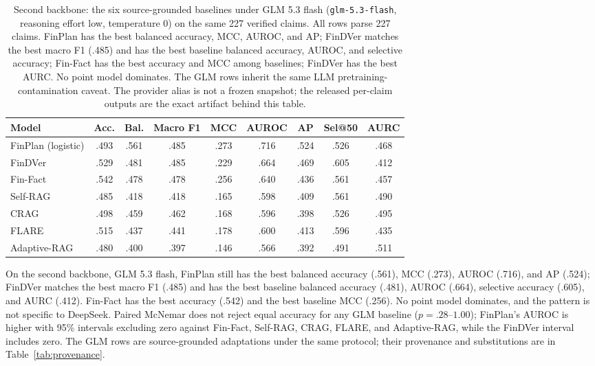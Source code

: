 \documentclass[11pt]{article}
\begin{document}
\begin{table}[t]
\centering
\small
\setlength{\tabcolsep}{3pt}
\begin{tabular}{lcccccccc}
\toprule
Model & Acc. & Bal. & Macro F1 & MCC & AUROC & AP & Sel@50 & AURC \\
\midrule
FinPlan (logistic) & .493 & .561 & .485 & .273 & .716 & .524 & .526 & .468 \\
FinDVer & .529 & .481 & .485 & .229 & .664 & .469 & .605 & .412 \\
Fin-Fact & .542 & .478 & .478 & .256 & .640 & .436 & .561 & .457 \\
Self-RAG & .485 & .418 & .418 & .165 & .598 & .409 & .561 & .490 \\
CRAG & .498 & .459 & .462 & .168 & .596 & .398 & .526 & .495 \\
FLARE & .515 & .437 & .441 & .178 & .600 & .413 & .596 & .435 \\
Adaptive-RAG & .480 & .400 & .397 & .146 & .566 & .392 & .491 & .511 \\
\bottomrule
\end{tabular}
\caption{Second backbone: the six source-grounded baselines under GLM 5.3
flash (\texttt{glm-5.3-flash}, reasoning effort low, temperature 0) on the same
227 verified claims. All rows parse 227 claims. FinPlan has the best balanced
accuracy, MCC, AUROC, and AP; FinDVer matches the best macro F1 (.485) and has
the best baseline balanced accuracy, AUROC, and selective accuracy; Fin-Fact
has the best accuracy and MCC among baselines; FinDVer has the best AURC. No
point model dominates. The GLM rows inherit the same LLM
pretraining-contamination caveat. The provider alias is not a frozen snapshot;
the released per-claim outputs are the exact artifact behind this table.}
\label{tab:metrics-glm}
\end{table}

On the second backbone, GLM 5.3 flash, FinPlan still has the best balanced
accuracy (.561), MCC (.273), AUROC (.716), and AP (.524); FinDVer matches the
best macro F1 (.485) and has the best baseline balanced accuracy (.481),
AUROC (.664), selective accuracy (.605), and AURC (.412). Fin-Fact has the
best accuracy (.542) and the best baseline MCC (.256). No point model
dominates, and the pattern is not specific to DeepSeek. Paired McNemar does not
reject equal accuracy for any GLM baseline ($p=.28$--$1.00$); FinPlan's AUROC
is higher with 95\% intervals excluding zero against Fin-Fact, Self-RAG, CRAG,
FLARE, and Adaptive-RAG, while the FinDVer interval includes zero. The GLM rows
are source-grounded adaptations under the same protocol; their provenance and
substitutions are in Table~\ref{tab:provenance}.
\end{document}
